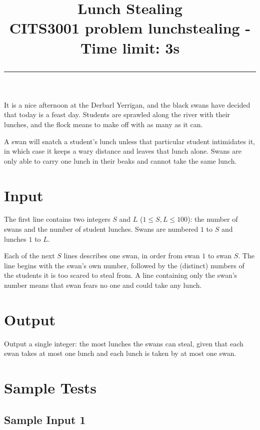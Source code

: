 \documentclass{article}
\title{\flushleft\textbf{Lunch Stealing} \\[1.0em] \small CITS3001 problem \textbf{lunchstealing} - Time limit: 3s \noindent\rule{\textwidth}{0.4pt}}
\date{}
\newcommand{\sampleboxwidth}{\dimexpr\textwidth-2\fboxsep-2\fboxrule\relax}
\begin{document}
\maketitle
\vspace{-90pt}
\section*{}
It is a nice afternoon at the Derbarl Yerrigan, and the black swans have decided that today is a feast day. Students are sprawled along the river with their lunches, and the flock means to make off with as many as it can.

A swan will snatch a student's lunch unless that particular student intimidates it, in which case it keeps a wary distance and leaves that lunch alone. Swans are only able to carry one lunch in their beaks and cannot take the same lunch.

\section*{Input}
The first line contains two integers $S$ and $L$ ($1 \le S, L \le 100$): the number of swans and the number of student lunches. Swans are numbered $1$ to $S$ and lunches $1$ to $L$.

Each of the next $S$ lines describes one swan, in order from swan $1$ to swan $S$. The line begins with the swan's own number, followed by the (distinct) numbers of the students it is too scared to steal from. A line containing only the swan's number means that swan fears no one and could take any lunch.

\section*{Output}
Output a single integer: the most lunches the swans can steal, given that each swan takes at most one lunch and each lunch is taken by at most one swan.

\section*{Sample Tests}

\subsection*{Sample Input 1}
\fbox{
  \begin{minipage}{\sampleboxwidth}
    \ttfamily
    3 3 \\
    1 3 \\
    2 1 \\
    3 2
  \end{minipage}%
}
\end{document}

